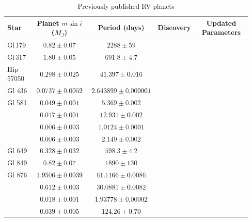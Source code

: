 \begin{landscape}
\begin{table}[hbt!]
\footnotesize
\begin{center}
\begin{tabular}{l|cccc}
\hline
Star & Planet $m \sin i$ ($M_J$) & Period (days) & Discovery & Updated Parameters \\
\hline
     Gl\,179 & $0.82 \pm 0.07$ & $2288 \pm 59$ & \citet{Howard10} & \citet{Howard10} \\
     Gl\,317 & $1.80 \pm 0.05$ & $691.8 \pm 4.7$ & \citet{Johnson07} & \citet{Anglada-Escude12a}   \\
  Hip 57050 & $0.298 \pm 0.025$ & $41.397 \pm 0.016$ & \citet{Haghighipour10} & \citet{Haghighipour10} \\ 
  Gl 436 & $0.0737 \pm 0.0052$ & $2.643899 \pm 0.000001$ & \citet{Butler04} & \citet{Southworth10}  \\
 Gl 581 & $0.049 \pm 0.001$ & $5.369 \pm 0.002$ & \citet{Bonfils05} & \citet{TadeuDosSantos12} \\
        & $0.017 \pm 0.001$ & $12.931 \pm 0.002$ & \citet{Udry07} & \citet{TadeuDosSantos12} \\
        & $0.006 \pm 0.003$ & $1.0124 \pm 0.0001$ & \citet{Udry07} & \citet{TadeuDosSantos12} \\
        & $0.006 \pm 0.003$ & $2.149 \pm 0.002$ & \citet{Mayor09} & \citet{TadeuDosSantos12} \\
 Gl 649 & $0.328 \pm 0.032$ & $598.3 \pm 4.2$ & \citet{Johnson10b} & \citet{Johnson10b} \\
 Gl 849 & $0.82 \pm 0.07$ & $1890 \pm 130$ & \citet{Butler06} & \citet{Butler06}  \\ 
     Gl 876 & $1.9506 \pm 0.0039$ & $61.1166 \pm 0.0086$ & \citet{Marcy98} & \citet{Rivera10} \\ 
        & $0.612 \pm 0.003$ & $30.0881 \pm 0.0082$ & \citet{Marcy01} & \citet{Rivera10} \\
        & $0.018 \pm 0.001$  & $1.93778 \pm 0.00002$ & \citet{Rivera05}& \citet{Rivera10} \\
        & $0.039 \pm 0.005$  & $124.26 \pm 0.70$ & \citet{Rivera10}& \citet{Rivera10} \\
        \hline
\end{tabular}
\caption{Previously published RV planets}
\end{center}
\label{knownpl}
\end{table}


\end{landscape}
